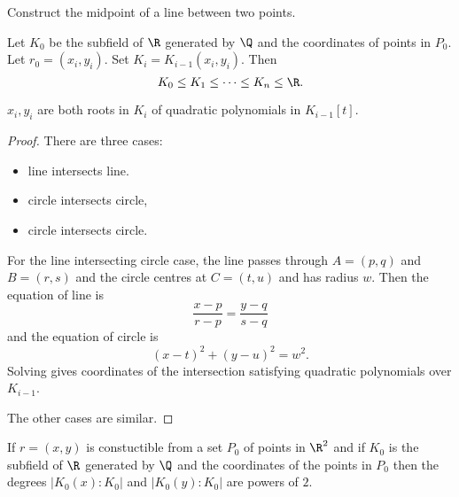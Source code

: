 \documentclass[a4paper]{article}
\begin{document}
\begin{ex}
  Construct the midpoint of a line between two points.
\end{ex}

Let \(K_0\) be the subfield of \(\R\) generated by \(\Q\) and the coordinates of points in \(P_0\). Let \(r_0 = (x_i, y_i)\). Set \(K_i = K_{i - 1}(x_i, y_i)\). Then
\[
  K_0 \leq K_1 \leq \dots \leq K_n \leq \R.
\]

\begin{lemma}
  \(x_i, y_i\) are both roots in \(K_i\) of quadratic polynomials in \(K_{i - 1}[t]\).
\end{lemma}

\begin{proof}
  There are three cases:
  \begin{itemize}
  \item line intersects line.
  \item circle intersects circle,
  \item circle intersects circle.
  \end{itemize}

  For the line intersecting circle case, the line passes through \(A = (p, q)\) and \(B = (r, s)\) and the circle centres at \(C = (t, u)\) and has radius \(w\). Then the equation of line is
  \[
    \frac{x - p}{r - p} = \frac{y - q}{s - q}
  \]
  and the equation of circle is
  \[
    (x - t)^2 + (y - u)^2 = w^2.
  \]
  Solving gives coordinates of the intersection satisfying quadratic polynomials over \(K_{i - 1}\).

  The other cases are similar.
\end{proof}

\begin{theorem}
  If \(r = (x, y)\) is constuctible from a set \(P_0\) of points in \(\R^2\) and if \(K_0\) is the subfield of \(\R\) generated by \(\Q\) and the coordinates of the points in \(P_0\) then the degrees \(|K_0(x) : K_0|\) and \(|K_0(y) : K_0|\) are powers of \(2\).
\end{theorem}
\end{document}
